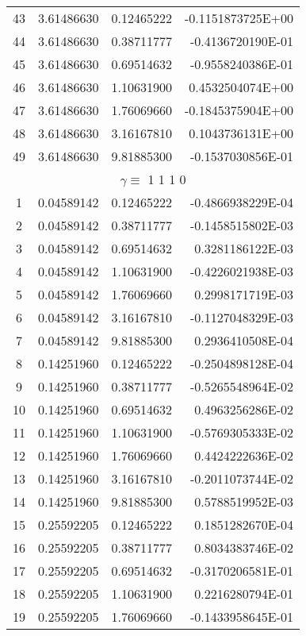 \begin{longtable}{@{\extracolsep{\fill}}cllr@{}}
43  &  3.61486630  &  0.12465222  &  -0.1151873725E+00 \\
44  &  3.61486630  &  0.38711777  &  -0.4136720190E-01 \\
45  &  3.61486630  &  0.69514632  &  -0.9558240386E-01 \\
46  &  3.61486630  &  1.10631900  &   0.4532504074E+00 \\
47  &  3.61486630  &  1.76069660  &  -0.1845375904E+00 \\
48  &  3.61486630  &  3.16167810  &   0.1043736131E+00 \\
49  &  3.61486630  &  9.81885300  &  -0.1537030856E-01 \\
\midrule
\multicolumn{4}{c}{ $\gamma \equiv $  1 1 1 0} \\
\midrule
1  &  0.04589142  &  0.12465222  &  -0.4866938229E-04 \\
2  &  0.04589142  &  0.38711777  &  -0.1458515802E-03 \\
3  &  0.04589142  &  0.69514632  &   0.3281186122E-03 \\
4  &  0.04589142  &  1.10631900  &  -0.4226021938E-03 \\
5  &  0.04589142  &  1.76069660  &   0.2998171719E-03 \\
6  &  0.04589142  &  3.16167810  &  -0.1127048329E-03 \\
7  &  0.04589142  &  9.81885300  &   0.2936410508E-04 \\
8  &  0.14251960  &  0.12465222  &  -0.2504898128E-04 \\
9  &  0.14251960  &  0.38711777  &  -0.5265548964E-02 \\
10  &  0.14251960  &  0.69514632  &   0.4963256286E-02 \\
11  &  0.14251960  &  1.10631900  &  -0.5769305333E-02 \\
12  &  0.14251960  &  1.76069660  &   0.4424222636E-02 \\
13  &  0.14251960  &  3.16167810  &  -0.2011073744E-02 \\
14  &  0.14251960  &  9.81885300  &   0.5788519952E-03 \\
15  &  0.25592205  &  0.12465222  &   0.1851282670E-04 \\
16  &  0.25592205  &  0.38711777  &   0.8034383746E-02 \\
17  &  0.25592205  &  0.69514632  &  -0.3170206581E-01 \\
18  &  0.25592205  &  1.10631900  &   0.2216280794E-01 \\
19  &  0.25592205  &  1.76069660  &  -0.1433958645E-01 \\

\end{longtable}
